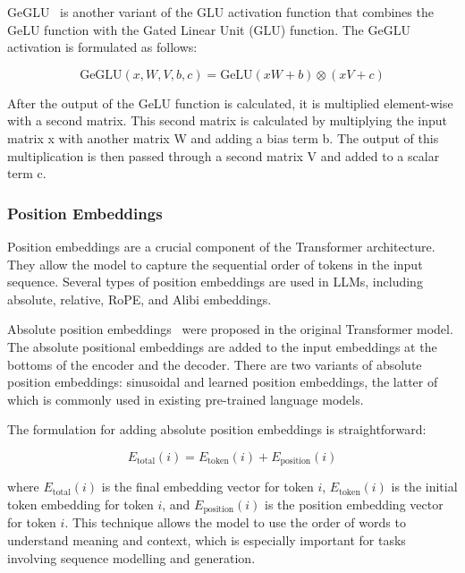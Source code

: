 GeGLU~\cite{shazeer2020glu} is another variant of the GLU activation function that combines the GeLU function with the Gated Linear Unit (GLU) function.
The GeGLU activation is formulated as follows:

\begin{equation}
	\text{GeGLU}\left(x, W, V, b, c\right) = \text{GeLU}\left(xW + b\right) \otimes \left(xV + c\right)
	\label{eq:geglu}
\end{equation}

\noindent After the output of the GeLU function is calculated, it is multiplied element-wise with a second matrix.
This second matrix is calculated by multiplying the input matrix x with another matrix W and adding a bias term b.
The output of this multiplication is then passed through a second matrix V and added to a scalar term c.

\subsubsection{Position Embeddings}
\label{subsubsec:position-embeddings}

Position embeddings are a crucial component of the Transformer architecture.
They allow the model to capture the sequential order of tokens in the input sequence.
Several types of position embeddings are used in LLMs, including absolute, relative, RoPE, and Alibi embeddings.

Absolute position embeddings~\cite{vaswani2023attention} were proposed in the original Transformer model.
The absolute positional embeddings are added to the input embeddings at the bottoms of the encoder and the decoder.
There are two variants of absolute position embeddings: sinusoidal and learned position embeddings, the latter of which is commonly used in existing pre-trained language models.

The formulation for adding absolute position embeddings is straightforward:

\begin{equation}
	E_{\text{total}}(i) = E_{\text{token}}(i) + E_{\text{position}}(i)
	\label{eq:absolute-position-embeddings}
\end{equation}

\noindent where \(E_{\text{total}}(i)\) is the final embedding vector for token \(i\), \(E_{\text{token}}(i)\) is the initial token embedding for token \(i\), and \(E_{\text{position}}(i)\) is the position embedding vector for token \(i\).
This technique allows the model to use the order of words to understand meaning and context, which is especially important for tasks involving sequence modelling and generation.

